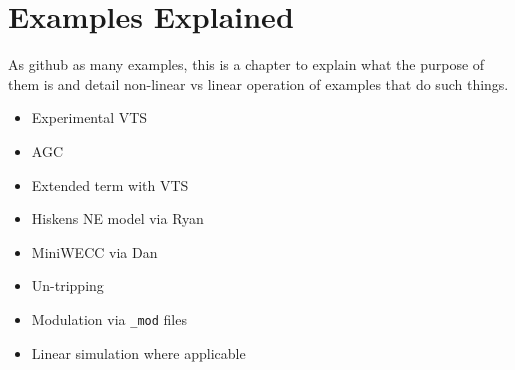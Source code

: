 \chapter{Examples Explained}
As github as many examples, this is a chapter to explain what the purpose of them is and detail non-linear vs linear operation of examples that do such things.

\begin{itemize}
\item Experimental VTS
\item AGC
\item Extended term with VTS
\item Hiskens NE model via Ryan
\item MiniWECC via Dan
\item Un-tripping
\item Modulation via \verb|_mod| files
\item Linear simulation where applicable
\end{itemize}